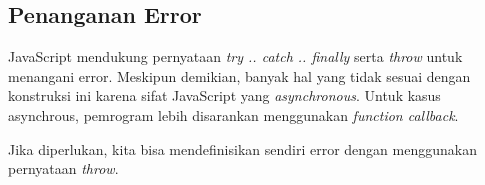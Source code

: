 



\subsection{Penanganan Error}

JavaScript mendukung pernyataan \textit{try .. catch .. finally} serta \textit{throw} untuk menangani error. Meskipun demikian, banyak hal yang tidak sesuai dengan konstruksi ini karena sifat JavaScript yang \textit{asynchronous}. Untuk kasus asynchrous, pemrogram lebih disarankan menggunakan \textit{function callback}.



Jika diperlukan, kita bisa mendefinisikan sendiri error dengan menggunakan pernyataan \textit{throw}.


